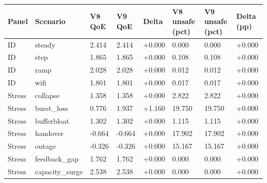 \begin{tabular}{llllllll}
\toprule
Panel & Scenario & V8 QoE & V9 QoE & Delta & V8 unsafe (pct) & V9 unsafe (pct) & Delta (pp) \\
\midrule
ID & steady & 2.414 & 2.414 & +0.000 & 0.000 & 0.000 & +0.000 \\
ID & step & 1.865 & 1.865 & +0.000 & 0.108 & 0.108 & +0.000 \\
ID & ramp & 2.028 & 2.028 & +0.000 & 0.012 & 0.012 & +0.000 \\
ID & wifi & 1.801 & 1.801 & +0.000 & 0.017 & 0.017 & +0.000 \\
Stress & collapse & 1.358 & 1.358 & +0.000 & 2.822 & 2.822 & +0.000 \\
Stress & burst\_loss & 0.776 & 1.937 & +1.160 & 19.750 & 19.750 & +0.000 \\
Stress & bufferbloat & 1.302 & 1.302 & +0.000 & 1.115 & 1.115 & +0.000 \\
Stress & handover & -0.664 & -0.664 & +0.000 & 17.902 & 17.902 & +0.000 \\
Stress & outage & -0.326 & -0.326 & +0.000 & 15.167 & 15.167 & +0.000 \\
Stress & feedback\_gap & 1.762 & 1.762 & +0.000 & 0.000 & 0.000 & +0.000 \\
Stress & capacity\_surge & 2.538 & 2.538 & +0.000 & 0.000 & 0.000 & +0.000 \\
\bottomrule
\end{tabular}
